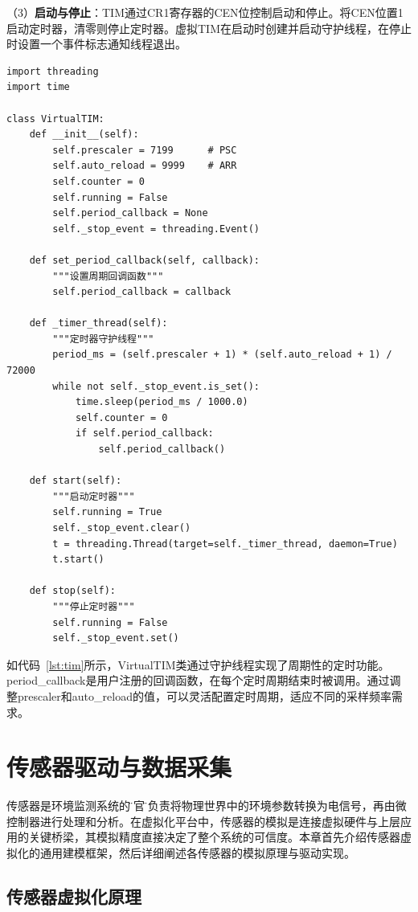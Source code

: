 \documentclass[12pt,a4paper]{ctexart}
\begin{document}
（3）\textbf{启动与停止}：TIM通过CR1寄存器的CEN位控制启动和停止。将CEN位置1启动定时器，清零则停止定时器。虚拟TIM在启动时创建并启动守护线程，在停止时设置一个事件标志通知线程退出。

\begin{lstlisting}[caption={虚拟TIM守护线程实现},label={lst:tim}]
import threading
import time

class VirtualTIM:
    def __init__(self):
        self.prescaler = 7199      # PSC
        self.auto_reload = 9999    # ARR
        self.counter = 0
        self.running = False
        self.period_callback = None
        self._stop_event = threading.Event()
    
    def set_period_callback(self, callback):
        """设置周期回调函数"""
        self.period_callback = callback
    
    def _timer_thread(self):
        """定时器守护线程"""
        period_ms = (self.prescaler + 1) * (self.auto_reload + 1) / 72000
        while not self._stop_event.is_set():
            time.sleep(period_ms / 1000.0)
            self.counter = 0
            if self.period_callback:
                self.period_callback()
    
    def start(self):
        """启动定时器"""
        self.running = True
        self._stop_event.clear()
        t = threading.Thread(target=self._timer_thread, daemon=True)
        t.start()
    
    def stop(self):
        """停止定时器"""
        self.running = False
        self._stop_event.set()
\end{lstlisting}

如代码~\ref{lst:tim}所示，VirtualTIM类通过守护线程实现了周期性的定时功能。period\_callback是用户注册的回调函数，在每个定时周期结束时被调用。通过调整prescaler和auto\_reload的值，可以灵活配置定时周期，适应不同的采样频率需求。



\section{传感器驱动与数据采集}

传感器是环境监测系统的\"感官\"，负责将物理世界中的环境参数转换为电信号，再由微控制器进行处理和分析。在虚拟化平台中，传感器的模拟是连接虚拟硬件与上层应用的关键桥梁，其模拟精度直接决定了整个系统的可信度。本章首先介绍传感器虚拟化的通用建模框架，然后详细阐述各传感器的模拟原理与驱动实现。

\subsection{传感器虚拟化原理}
\end{document}
